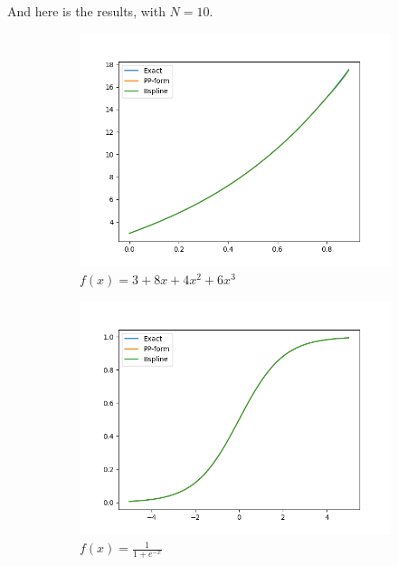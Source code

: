 \documentclass[a4paper]{article}
\begin{document}
And here is the results, with $N = 10$.
\begin{figure}[H]
    \centering
    \begin{subfigure}[b]{0.45\textwidth}
        \centering
        \includegraphics[width=\textwidth]{../figure/SplineTest1.png}
        \caption{$f(x) = 3+8x+4x^2+6x^3$}
    \end{subfigure}
    \begin{subfigure}[b]{0.45\textwidth}
        \centering
        \includegraphics[width=\textwidth]{../figure/SplineTest2.png}
        \caption{$f(x) = \frac{1}{1 + e^{-x}}$}
    \end{subfigure}
    \\ 
    \begin{subfigure}[b]{0.45\textwidth}

\end{subfigure}
\end{figure}
\end{document}
